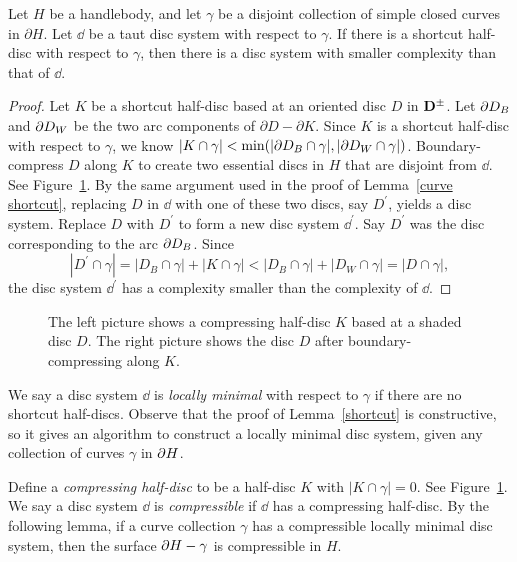 \begin{lemma}
\label{shortcut}
Let $H$ be a handlebody, and let $\gamma$ be a disjoint collection of simple closed curves in $\partial H$.  Let $\dd$ be a taut disc system with respect to $\gamma$.  If there is a shortcut half-disc with respect to $\gamma$, then there is a disc system with smaller complexity than that of $\dd$.
\end{lemma}

\begin{proof}
Let $K$ be a shortcut half-disc based at an oriented disc 
$D$ in $\mathbf{D}^\pm$.  Let $\partial D_B$ and $\partial D_W$ be the two arc components of $\partial D-\partial K$.
Since $K$ is a shortcut half-disc with respect to $\gamma$, 
we know 
$|K\cap\gamma|<\min(|\partial D_B\cap\gamma|,|\partial D_W\cap\gamma|)$.
Boundary-compress $D$ along $K$ to create two essential 
discs in $H$ that are disjoint from $\dd$.  See Figure~\ref{halfdisc_compress}.
By the same argument used in the proof of Lemma~\ref{curve shortcut}, replacing $D$ in $\dd$ with one of these two discs, say $D^\prime$, yields a disc system.  Replace $D$ with $D^\prime$ to form a new disc system $\dd^\prime$.  Say $D^\prime$ was the disc corresponding to the arc $\partial D_B$.  Since
$$|D^\prime\cap\gamma|=|D_B\cap\gamma|+|K\cap\gamma|<
|D_B\cap\gamma|+|D_W\cap\gamma|=|D\cap\gamma|,$$ 
the disc system $\dd^\prime$ has a complexity smaller than the complexity of $\dd$.
\end{proof}

\begin{figure}
\caption{The left picture shows a compressing half-disc $K$ based at a shaded disc $D$.  The right picture shows the disc $D$ after boundary-compressing along $K$.}
\label{halfdisc_compress}
\end{figure}

We say a disc system $\dd$ is \emph{locally minimal} with respect to $\gamma$ if there are no shortcut half-discs.  Observe that the proof of Lemma~\ref{shortcut} is constructive, so it gives an algorithm to construct a locally minimal disc system, given any collection of curves $\gamma$ in $\partial H$.

Define a \emph{compressing half-disc} to be a half-disc $K$ with $|K\cap\gamma|=0$.  See Figure~\ref{halfdisc_compress}.  We say a disc system $\dd$ is \emph{compressible} if $\dd$ has a compressing half-disc.  By the following lemma, if a curve collection $\gamma$ has a compressible locally minimal disc system, then the surface $\partial H-\gamma$ is compressible in $H$.

